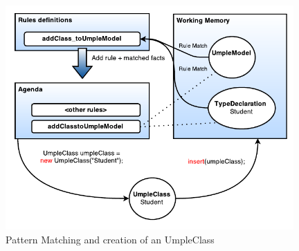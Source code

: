 \begin{figure}[h]
\centering
\includegraphics[width=0.98\textwidth]{Figures/ruleModel.pdf}
\caption{Pattern Matching and creation of an UmpleClass}
\label{fig:ruleModel2}
\end{figure}

%
%
%
%
%
%	
%    


